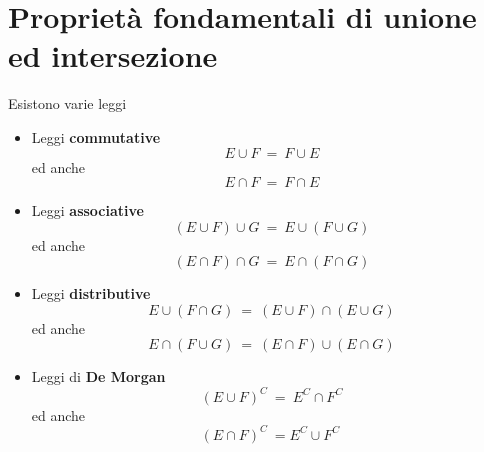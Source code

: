 \documentclass{report}
\begin{document}
\section{Proprietà fondamentali di unione ed intersezione}
Esistono varie leggi
\begin{itemize}
    \item Leggi \textbf{commutative} \[E \cup F\ =\ F \cup E\] ed anche \[E \cap F\ =\ F \cap E\]
    \item Leggi \textbf{associative} \[(E \cup F) \cup G\ =\ E \cup (F \cup G)\] ed anche \[(E \cap F)\cap G\ =\ E \cap (F \cap G)\]
    \item Leggi \textbf{distributive} \[E \cup (F \cap G)\ =\ (E \cup F)\cap (E \cup G)\] ed anche \[E \cap (F \cup G)\ =\ (E \cap F)\cup (E \cap G)\]
    \item Leggi di \textbf{De Morgan} \[(E \cup F)^C\ =\ E^C \cap F^C\] ed anche \[(E \cap F)^C\ = E^C \cup F^C\ \]
\end{itemize}
\end{document}
